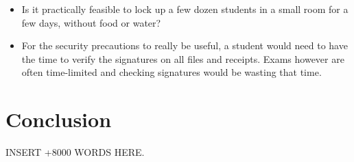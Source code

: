 \documentclass[12pt]{article}
\begin{document}
\begin{itemize}

\item Is it practically feasible to lock up a few dozen students in a small room
for a few days, without food or water?

\item For the security precautions to really be useful, a student would need to have the time to verify the signatures on all files and receipts. Exams however
are often time-limited and checking signatures would be wasting that time.

\end{itemize}

\section{Conclusion}
\label{sec:conclusion}

INSERT +8000 WORDS HERE.
\end{document}
